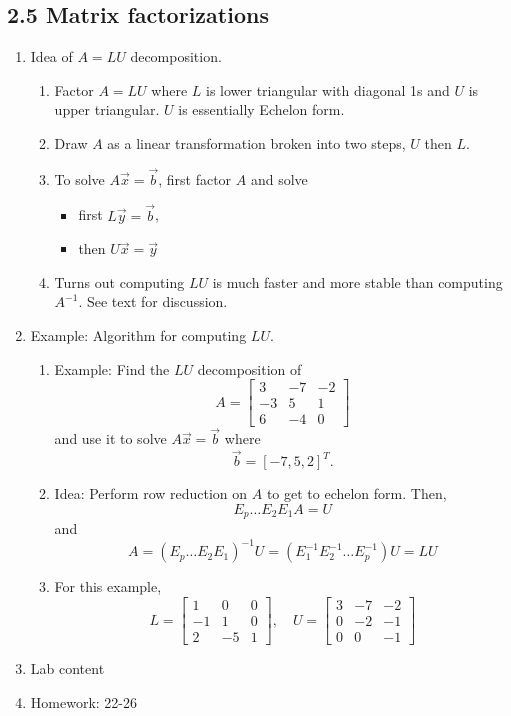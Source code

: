 \documentclass{article}
\begin{document}
\subsection{2.5 Matrix factorizations}

\begin{enumerate}

\item Idea of $A=LU$ decomposition.
\begin{enumerate}
\item Factor $A=LU$ where $L$ is lower triangular with diagonal 1s and $U$ is upper triangular. $U$ is essentially Echelon form.
\item Draw $A$ as a linear transformation broken into two steps, $U$ then $L$.
\item To solve $A\vec{x} = \vec{b}$, first factor $A$ and solve
\begin{itemize}
\item first $L\vec{y} = \vec{b}$,
\item then $U\vec{x} = \vec{y}$
\end{itemize}
\item Turns out computing $LU$ is much faster and more stable than computing $A^{-1}$. See text for discussion.
\end{enumerate}

\item Example: Algorithm for computing $LU$.
\begin{enumerate}
\item Example: Find the $LU$ decomposition of 
\[
A = \left[
\begin{array}{ccc}
3 & -7 & -2 \\
-3 & 5 & 1 \\
6 & -4 & 0
\end{array}
\right]
\]
and use it to solve $A\vec{x}=\vec{b}$ where
\[
\vec{b} = [-7, 5, 2]^T.
\]
\item Idea: Perform row reduction on $A$ to get to echelon form. Then,
\[
E_p \dots E_2 E_1 A = U 
\]
and
\[
A = (E_p \dots E_2 E_1 )^{-1} U = (E_1^{-1} E_2 ^{-1} \dots E_p^{-1} ) U = LU
\]
\item For this example,
\[
L = \left[ 
\begin{array}{ccc}
1 & 0 & 0 \\
-1 & 1 & 0 \\
2 & -5 & 1
\end{array}
\right], \quad
U = \left[ 
\begin{array}{ccc}
3 & -7 & -2 \\
0 & -2 & -1 \\
0 & 0 & -1
\end{array}
\right]
\]
\end{enumerate}

\item Lab content

\item Homework: 22-26

\end{enumerate}
\end{document}
